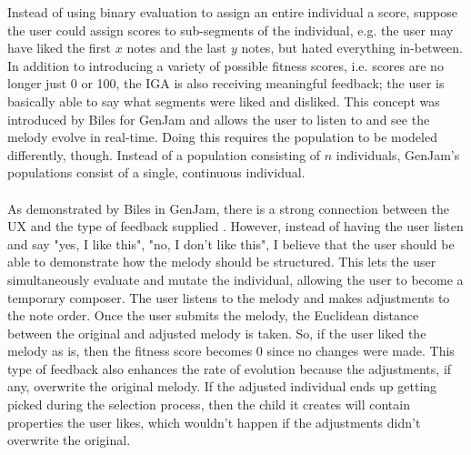 \documentclass[12pt]{article} %
\begin{document}
Instead of using binary evaluation to assign an entire individual a score, suppose the user could assign scores to sub-segments of the individual, e.g. the user may have liked the first $x$ notes and the last $y$ notes, but hated everything in-between. In addition to introducing a variety of possible fitness scores, i.e. scores are no longer just 0 or 100, the IGA is also receiving meaningful feedback; the user is basically able to say what segments were liked and disliked. This concept was introduced by Biles for GenJam \cite{Biles94} and allows the user to listen to and see the melody evolve in real-time. Doing this requires the population to be modeled differently, though. Instead of a population consisting of $n$ individuals, GenJam's populations consist of a single, continuous individual. \\
\\
As demonstrated by Biles in GenJam, there is a strong connection between the UX and the type of feedback supplied \cite{Biles94}. However, instead of having the user listen and say "yes, I like this", "no, I don't like this", I believe that the user should be able to demonstrate how the melody should be structured. This lets the user simultaneously evaluate and mutate the individual, allowing the user to become a temporary composer. The user listens to the melody and makes adjustments to the note order. Once the user submits the melody, the Euclidean distance between the original and adjusted melody is taken. So, if the user liked the melody as is, then the fitness score becomes 0 since no changes were made. This type of feedback also enhances the rate of evolution because the adjustments, if any, overwrite the original melody.  If the adjusted individual ends up getting picked during the selection process, then the child it creates will contain properties the user likes, which wouldn't happen if the adjustments didn't overwrite the original. \\
\\
\end{document}

